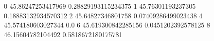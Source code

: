 0 45.86247253417969 0.28829193115234375
1 45.76301193237305 0.18883132934570312
2 45.64827346801758 0.07409286499023438
4 45.574180603027344 0.0
6 45.619300842285156 0.0451202392578125
8 46.15604782104492 0.5818672180175781
